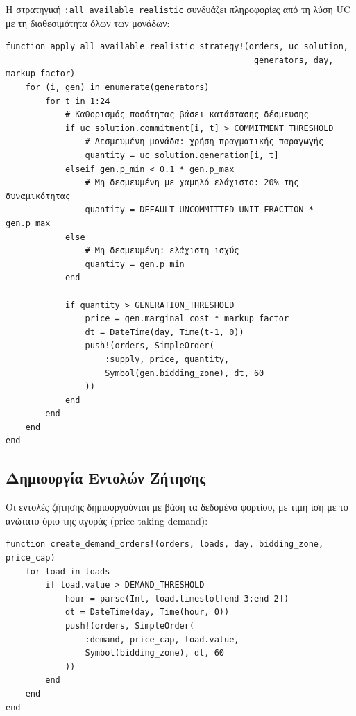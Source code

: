 Η στρατηγική \texttt{:all\_available\_realistic} συνδυάζει πληροφορίες από τη λύση UC με τη διαθεσιμότητα όλων των μονάδων:

\begin{samepage}
\begin{verbatim}
function apply_all_available_realistic_strategy!(orders, uc_solution, 
                                                  generators, day, markup_factor)
    for (i, gen) in enumerate(generators)
        for t in 1:24
            # Καθορισμός ποσότητας βάσει κατάστασης δέσμευσης
            if uc_solution.commitment[i, t] > COMMITMENT_THRESHOLD
                # Δεσμευμένη μονάδα: χρήση πραγματικής παραγωγής
                quantity = uc_solution.generation[i, t]
            elseif gen.p_min < 0.1 * gen.p_max
                # Μη δεσμευμένη με χαμηλό ελάχιστο: 20% της δυναμικότητας
                quantity = DEFAULT_UNCOMMITTED_UNIT_FRACTION * gen.p_max
            else
                # Μη δεσμευμένη: ελάχιστη ισχύς
                quantity = gen.p_min
            end
            
            if quantity > GENERATION_THRESHOLD
                price = gen.marginal_cost * markup_factor
                dt = DateTime(day, Time(t-1, 0))
                push!(orders, SimpleOrder(
                    :supply, price, quantity,
                    Symbol(gen.bidding_zone), dt, 60
                ))
            end
        end
    end
end
\end{verbatim}
\end{samepage}

\subsection{Δημιουργία Εντολών Ζήτησης}
\label{subsec:demand-orders-creation}

Οι εντολές ζήτησης δημιουργούνται με βάση τα δεδομένα φορτίου, με τιμή ίση με το ανώτατο όριο της αγοράς (price-taking demand):

\begin{samepage}
\begin{verbatim}
function create_demand_orders!(orders, loads, day, bidding_zone, price_cap)
    for load in loads
        if load.value > DEMAND_THRESHOLD
            hour = parse(Int, load.timeslot[end-3:end-2])
            dt = DateTime(day, Time(hour, 0))
            push!(orders, SimpleOrder(
                :demand, price_cap, load.value,
                Symbol(bidding_zone), dt, 60
            ))
        end
    end
end
\end{verbatim}
\end{samepage}


